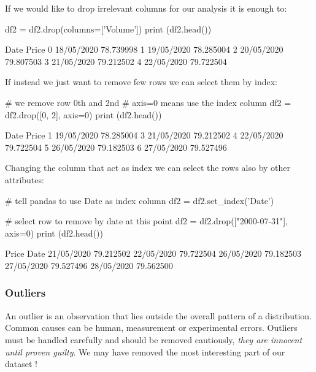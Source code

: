 If we would like to drop irrelevant columns for our analysis it is enough to:

\begin{ipythonnon}
df2 = df2.drop(columns=['Volume'])
print (df2.head())
\end{ipythonnon}
\begin{ioutput}
         Date      Price
0  18/05/2020  78.739998
1  19/05/2020  78.285004
2  20/05/2020  79.807503
3  21/05/2020  79.212502
4  22/05/2020  79.722504
\end{ioutput}
        
If instead we just want to remove few rows we can select them by index:

\begin{ipythonnon}
# we remove row 0th and 2nd
# axis=0 means use the index column
df2 = df2.drop([0, 2], axis=0)
print (df2.head())
\end{ipythonnon}
\begin{ioutput}
         Date      Price
1  19/05/2020  78.285004
3  21/05/2020  79.212502
4  22/05/2020  79.722504
5  26/05/2020  79.182503
6  27/05/2020  79.527496
\end{ioutput}
        
Changing the column that act as index we can select the rows also by other attributes:

\begin{ipythonnon}
# tell pandas to use Date as index column
df2 = df2.set_index('Date')

# select row to remove by date at this point
df2 = df2.drop(["2000-07-31"], axis=0)
print (df2.head())
\end{ipythonnon}
\begin{ioutput}
                Price
Date                 
21/05/2020  79.212502
22/05/2020  79.722504
26/05/2020  79.182503
27/05/2020  79.527496
28/05/2020  79.562500
\end{ioutput}
        
\subsubsection{Outliers}\label{outliers}

An outlier is an observation that lies outside the overall pattern of a distribution. Common causes can be human, measurement or experimental errors. Outliers must be handled carefully and should be removed cautiously, \emph{they are innocent until proven guilty}. We may have removed the most interesting part of our dataset !

